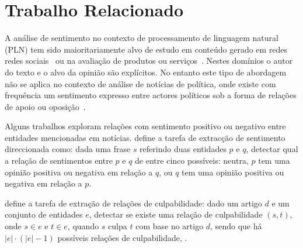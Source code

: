 \documentclass[a4paper, twocolumn, 11pt, twoside]{article}
\begin{document}
\section{Trabalho Relacionado}
\label{sec_related_work}

A análise de sentimento no contexto de processamento de linguagem natural (PLN) tem sido maioritariamente alvo de estudo em conteúdo gerado em redes redes sociais~\citep{10.1145/3185045} ou na avaliação de produtos ou serviços~\citep{pontiki-etal-2016-semeval}. Nestes domínios o autor do texto e o alvo da opinião são explícitos. No entanto este tipo de abordagem não se aplica no contexto de análise de notícias de política, onde existe com frequência um sentimento expresso entre actores políticos sob a forma de relações de apoio ou oposição~\citep{balahur2009opinion, balahur-etal-2010-sentiment}.

Alguns trabalhos exploram relações com sentimento positivo ou negativo entre entidades mencionadas em notícias. \cite{park-etal-2021-blames} define a tarefa de extracção de sentimento direccionada como: dada uma frase $s$ referindo duas entidades $p$ e $q$, detectar qual a relação de sentimentos entre $p$ e $q$ de entre cinco possíveis: neutra, $p$ tem uma opinião positiva ou negativa em relação a $q$, ou $q$ tem uma opinião positiva ou negativa em relação a $p$.


\cite{liang2019blames} define a tarefa de extração de relações de culpabilidade: dado um artigo $d$ e um conjunto de entidades $e$, detectar se existe uma relação de culpabilidade $(s,t)$, onde $s \in e$ e $t \in e$, quando $s$ culpa $t$ com base no artigo $d$, sendo que há $|e| \cdot (|e| - 1)$ possíveis relações de culpabilidade, .

\end{document}
